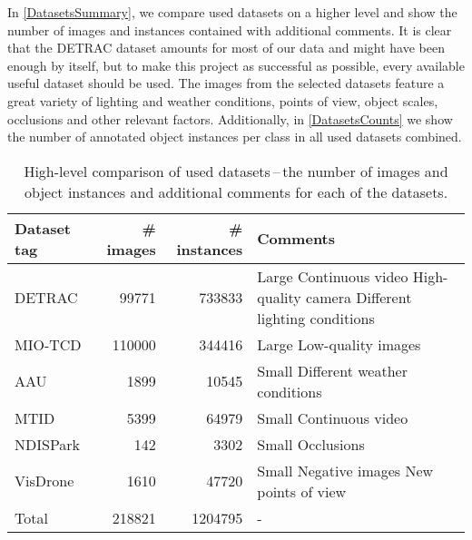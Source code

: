 In \autoref{DatasetsSummary}, we compare used datasets on a higher level and
show the number of images and instances contained with additional comments. It
is clear that the DETRAC dataset amounts for most of our
data and might have been enough by itself, but to make this project as
successful as possible, every available useful dataset should be used. The
images from the selected datasets feature a great variety of lighting and
weather conditions, points of view, object scales, occlusions and other relevant factors.
Additionally, in \autoref{DatasetsCounts} we show the number of annotated object
instances per class in all used datasets combined.

\begin{table}[h]
\centering
\begin{tabular}{|l|rr|p{5cm}|}
    \hline
    Dataset tag & \# images & \# instances & Comments \\
    \hline
    DETRAC      &  \num{99771}  & \num{733833} & Large \newline Continuous video \newline High-quality camera \newline Different lighting conditions \\
    \hline
    MIO-TCD     &  \num{110000} & \num{344416} & Large \newline Low-quality images \\
    \hline
    AAU         &    \num{1899} &  \num{10545} & Small \newline Different weather conditions \\
    \hline
    MTID        &    \num{5399} &  \num{64979} & Small \newline Continuous video \\
    \hline
    NDISPark    &     \num{142} &   \num{3302} & Small \newline Occlusions \\
    \hline
    VisDrone    &    \num{1610} &  \num{47720} & Small \newline Negative images \newline New points of view \\
    \hline
    \hline
    Total       &  \num{218821} & \num{1204795} & - \\
    \hline
\end{tabular}
\caption{High-level comparison of used datasets\,--\,the number of images and object instances and additional comments for each of the datasets.}
\label{DatasetsSummary}
\end{table}

